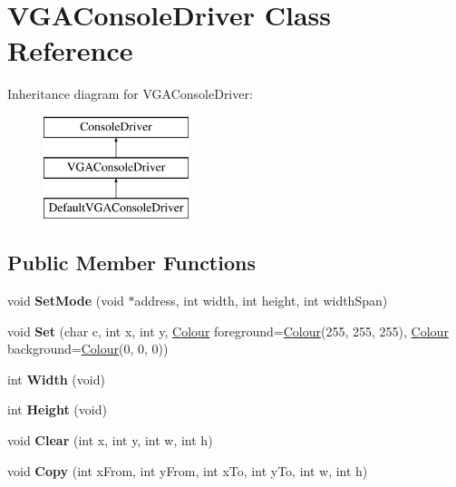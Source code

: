 \hypertarget{class_v_g_a_console_driver}{}\section{V\+G\+A\+Console\+Driver Class Reference}
\label{class_v_g_a_console_driver}
Inheritance diagram for V\+G\+A\+Console\+Driver\+:\begin{figure}[H]
\begin{center}
\leavevmode
\includegraphics[height=3.000000cm]{class_v_g_a_console_driver}
\end{center}
\end{figure}
\subsection*{Public Member Functions}
\begin{DoxyCompactItemize}
\item 
\mbox{\label{class_v_g_a_console_driver_a64c684e63ae87d41c1105a2d08dd22cc}} 
void {\bfseries Set\+Mode} (void $\ast$address, int width, int height, int width\+Span)
\item 
\mbox{\label{class_v_g_a_console_driver_a5c82fbfc1f5b55f624ccf5ca6a539779}} 
void {\bfseries Set} (char c, int x, int y, \hyperlink{class_console_driver_1_1_colour}{Colour} foreground=\hyperlink{class_console_driver_1_1_colour}{Colour}(255, 255, 255), \hyperlink{class_console_driver_1_1_colour}{Colour} background=\hyperlink{class_console_driver_1_1_colour}{Colour}(0, 0, 0))
\item 
\mbox{\label{class_v_g_a_console_driver_a54f7a1dfe6571c678e251a44f6bfda89}} 
int {\bfseries Width} (void)
\item 
\mbox{\label{class_v_g_a_console_driver_aaddd2f2b2c02da75ff62662e7f4d6250}} 
int {\bfseries Height} (void)
\item 
\mbox{\label{class_v_g_a_console_driver_a4e98bd6ae971bc041b4add6ab7372938}} 
void {\bfseries Clear} (int x, int y, int w, int h)
\item 
\mbox{\label{class_v_g_a_console_driver_a51ce1ba600083b5485916cadd6e6ab10}} 
void {\bfseries Copy} (int x\+From, int y\+From, int x\+To, int y\+To, int w, int h)
\end{DoxyCompactItemize}
